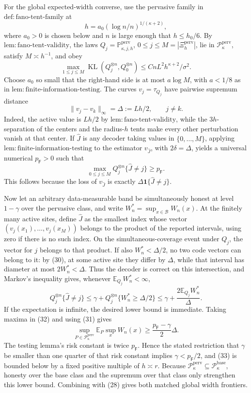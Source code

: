 For the global expected-width converse, use the pervasive family in \(\mathrm{def:fano\text{-}tent\text{-}family}\) at
\[
 h=a_0(\log n/n)^{1/(\kappa+2)},
\]
where \(a_0>0\) is chosen below and \(n\) is large enough that \(h\le h_0/6\).  By \(\mathrm{lem:fano\text{-}tent\text{-}validity}\), the laws \(Q_j=\mathbb P_{\kappa,j,h}^{\mathrm{perv}}\), \(0\le j\le M=|\Xi_h^{\mathrm{perv}}|\), lie in \(\mathcal P_{\kappa}^{\mathrm{perv}}\), satisfy \(M\asymp h^{-1}\), and obey
\[
 \max_{1\le j\le M}\operatorname{KL}(Q_j^{\otimes n},Q_0^{\otimes n})
 \le CnL^2h^{\kappa+2}/\sigma^2. \tag{29}
\]
Choose \(a_0\) so small that the right-hand side is at most \(a\log M\), with \(a<1/8\) as in \(\mathrm{lem:finite\text{-}information\text{-}testing}\).  The curves \(v_j=\tau_{Q_j}\) have pairwise supremum distance
\[
 \lVert v_j-v_k\rVert_\infty=\Delta:=Lh/2,
 \qquad j\ne k. \tag{30}
\]
Indeed, the active value is \(Lh/2\) by \(\mathrm{lem:fano\text{-}tent\text{-}validity}\), while the \(3h\)-separation of the centers and the radius-\(h\) tents make every other perturbation vanish at that center.  If \(\widehat J\) is any decoder taking values in \(\{0,\ldots,M\}\), applying \(\mathrm{lem:finite\text{-}information\text{-}testing}\) to the estimator \(v_{\widehat J}\), with \(2\delta=\Delta\), yields a universal numerical \(p_{\mathsf F}>0\) such that
\[
 \max_{0\le j\le M}Q_j^{\otimes n}\{\widehat J\ne j\}\ge p_{\mathsf F}. \tag{31}
\]
This follows because the loss of \(v_{\widehat J}\) is exactly \(\Delta\mathbf 1\{\widehat J\ne j\}\).

Now let an arbitrary data-measurable band be simultaneously honest at level \(1-\gamma\) over the pervasive class, and write \(W_n^*=\sup_{x\in\mathcal B}W_n(x)\).  At the finitely many active sites, define \(\widehat J\) as the smallest index whose vector \((v_j(x_1),\ldots,v_j(x_M))\) belongs to the product of the reported intervals, using zero if there is no such index.  On the simultaneous-coverage event under \(Q_j\), the vector for \(j\) belongs to that product.  If also \(W_n^*<\Delta/2\), no two code vectors can belong to it: by (30), at some active site they differ by \(\Delta\), while that interval has diameter at most \(2W_n^*<\Delta\).  Thus the decoder is correct on this intersection, and Markov's inequality gives, whenever \(\mathbb E_{Q_j}W_n^*<\infty\),
\[
 Q_j^{\otimes n}\{\widehat J\ne j\}
 \le \gamma+Q_j^{\otimes n}\{W_n^*\ge\Delta/2\}
 \le \gamma+\frac{2\mathbb E_{Q_j}W_n^*}{\Delta}. \tag{32}
\]
If the expectation is infinite, the desired lower bound is immediate.  Taking maxima in (32) and using (31) gives
\[
 \sup_{P\in\mathcal P_{\kappa}^{\mathrm{perv}}}
 \mathbb E_P\sup_xW_n(x)
 \ge \frac{p_{\mathsf F}-\gamma}{2}\Delta. \tag{33}
\]
The testing lemma's risk constant is twice \(p_{\mathsf F}\).  Hence the stated restriction that \(\gamma\) be smaller than one quarter of that risk constant implies \(\gamma<p_{\mathsf F}/2\), and (33) is bounded below by a fixed positive multiple of \(h\asymp r\).  Because \(\mathcal P_{\kappa}^{\mathrm{perv}}\subseteq\mathcal P_{\kappa}^{\mathrm{base}}\), honesty over the base class and the supremum over that class only strengthen this lower bound.  Combining with (28) gives both matched global width frontiers.

